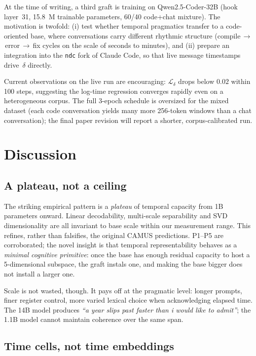 \documentclass[10pt,twocolumn,letterpaper]{article}
\begin{document}
At the time of writing, a third graft is training on Qwen2.5-Coder-32B (hook layer~31, 15.8~M trainable parameters, 60/40 code+chat mixture). The motivation is twofold: (i) test whether temporal pragmatics transfer to a code-oriented base, where conversations carry different rhythmic structure (compile\,$\rightarrow$\,error\,$\rightarrow$\,fix cycles on the scale of seconds to minutes), and (ii) prepare an integration into the \texttt{ndc} fork of Claude Code, so that live message timestamps drive~$\delta$ directly.

Current observations on the live run are encouraging: $\mathcal{L}_\delta$ drops below $0.02$ within 100 steps, suggesting the log-time regression converges rapidly even on a heterogeneous corpus. The full 3-epoch schedule is oversized for the mixed dataset (each code conversation yields many more 256-token windows than a chat conversation); the final paper revision will report a shorter, corpus-calibrated run.

\section{Discussion}

\subsection{A plateau, not a ceiling}

The striking empirical pattern is a \emph{plateau} of temporal capacity from 1B parameters onward. Linear decodability, multi-scale separability and SVD dimensionality are all invariant to base scale within our measurement range. This refines, rather than falsifies, the original CAMUS predictions. P1--P5 are corroborated; the novel insight is that temporal representability behaves as a \emph{minimal cognitive primitive}: once the base has enough residual capacity to host a 5-dimensional subspace, the graft instals one, and making the base bigger does not install a larger one.

Scale is not wasted, though. It pays off at the pragmatic level: longer prompts, finer register control, more varied lexical choice when acknowledging elapsed time. The 14B model produces \emph{``a year slips past faster than i would like to admit''}; the 1.1B model cannot maintain coherence over the same span.

\subsection{Time cells, not time embeddings}
\end{document}
